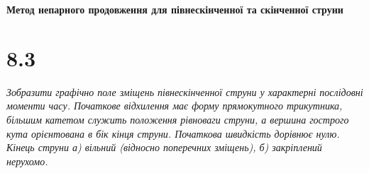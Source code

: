 


%


\textbf{\large Метод непарного продовження для півнескінченної та скінченної струни}

\section[Задача №8.3]{8.3}

\textit{Зобразити графічно поле зміщень півнескінченної струни у характерні послідовні моменти часу. Початкове відхилення має форму прямокутного трикутника, більшим катетом служить положення рівноваги струни, а вершина гострого кута орієнтована в бік кінця струни. Початкова швидкість дорівнює нулю. Кінець струни а) вільний (відносно поперечних зміщень), б) закріплений нерухомо.}


%